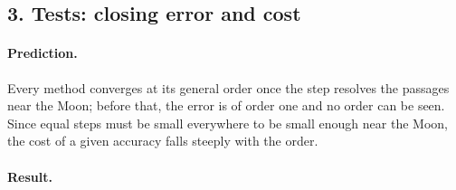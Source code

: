 \documentclass[11pt,a4paper]{article}
\begin{document}
\newpage
\subsection*{3. Tests: closing error and cost}

\paragraph{Prediction.} Every method converges at its general order once the
step resolves the passages near the Moon; before that, the error is of order
one and no order can be seen. Since equal steps must be small everywhere to
be small enough near the Moon, the cost of a given accuracy falls steeply
with the order.

\paragraph{Result.}
\begin{center}
\small

\end{center}
\end{document}
